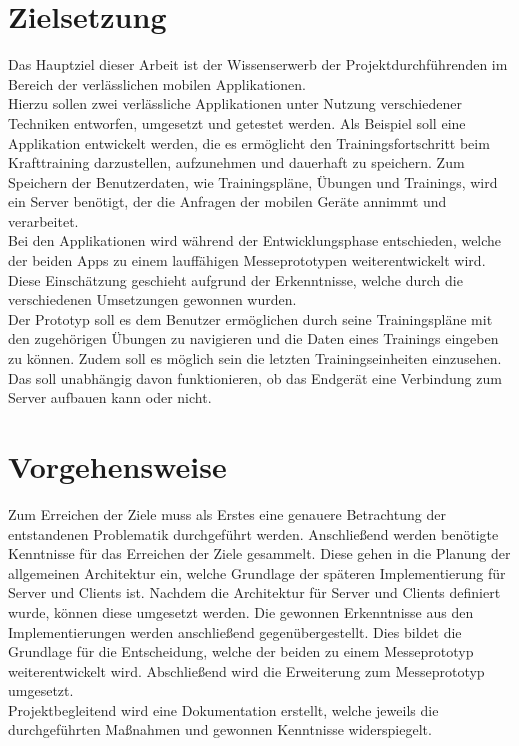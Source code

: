 \section{Zielsetzung}
\label{sec:zielsetzung}
Das Hauptziel dieser Arbeit ist der Wissenserwerb der Projektdurchführenden im Bereich der verlässlichen mobilen Applikationen. \\
Hierzu sollen zwei verlässliche Applikationen unter Nutzung verschiedener Techniken entworfen, umgesetzt und getestet werden. Als Beispiel soll eine Applikation entwickelt werden, die es ermöglicht den Trainingsfortschritt beim Krafttraining darzustellen, aufzunehmen und dauerhaft zu speichern. Zum Speichern der Benutzerdaten, wie Trainingspläne, Übungen und Trainings, wird ein Server benötigt, der die Anfragen der mobilen Geräte annimmt und verarbeitet.\\
Bei den Applikationen wird während der Entwicklungsphase entschieden, welche der beiden Apps zu einem lauffähigen Messeprototypen weiterentwickelt wird. Diese Einschätzung geschieht aufgrund der Erkenntnisse, welche durch die verschiedenen Umsetzungen gewonnen wurden.\\
Der Prototyp soll es dem Benutzer ermöglichen durch seine Trainingspläne mit den zugehörigen Übungen zu navigieren und die Daten eines Trainings eingeben zu können. Zudem soll es möglich sein die letzten Trainingseinheiten einzusehen. Das soll unabhängig davon funktionieren, ob das Endgerät eine Verbindung zum Server aufbauen kann oder nicht.
\section{Vorgehensweise}
\label{sec:vorgehensweise}
Zum Erreichen der Ziele muss als Erstes eine genauere Betrachtung der entstandenen Problematik durchgeführt werden. Anschließend werden benötigte Kenntnisse für das Erreichen der Ziele gesammelt. Diese gehen in die Planung der allgemeinen Architektur ein, welche Grundlage der späteren Implementierung für Server und Clients ist. Nachdem die Architektur für Server und Clients definiert wurde, können diese umgesetzt werden. Die gewonnen Erkenntnisse aus den Implementierungen werden anschließend gegenübergestellt. Dies bildet die Grundlage für die Entscheidung, welche der beiden zu einem Messeprototyp weiterentwickelt wird. Abschließend wird die Erweiterung zum Messeprototyp umgesetzt.\\
Projektbegleitend wird eine Dokumentation erstellt, welche jeweils die durchgeführten Maßnahmen und gewonnen Kenntnisse widerspiegelt. 
